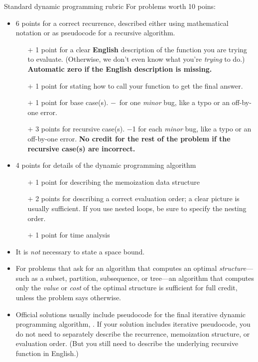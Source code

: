 \documentclass[11pt]{article}
\begin{document}
\begin{rubric}{Standard dynamic programming rubric} For problems worth 10 poins:

\begin{itemize}
\item 6 points for a correct recurrence, described either using mathematical notation or as pseudocode for a recursive algorithm.
\begin{itemize}\cramped
\item[$+$]
1 point for a clear \textbf{English} description of the function you are trying to evaluate.  (Otherwise, we don’t even know what you’re \emph{trying} to do.)  \textbf{Automatic zero if the English description is missing.}
\item[$+$]
1 point for stating how to call your function to get the final answer.
\item[$+$]
1 point for base case(s).  $-$\textonehalf\ for one \emph{minor} bug, like a typo  or an off-by-one error.
\item[$+$]
3 points for recursive case(s).  $-$1 for each \emph{minor} bug, like a typo or an off-by-one error.
\textbf{No credit for the rest of the problem if the recursive case(s) are incorrect.}
\end{itemize}
\item
4 points for details of the dynamic programming algorithm
\begin{itemize}\cramped
\item[$+$]
1 point for describing the memoization data structure
\item[$+$]
2 points for describing a correct evaluation order; a clear picture is usually sufficient.  If you use nested loops, be sure to specify the nesting order.
\item[$+$]
1 point for time analysis
\end{itemize}
\item
It is \emph{not} necessary to state a space bound.

\item
For problems that ask for an algorithm that computes an optimal \emph{structure}---such as a subset, partition, subsequence, or tree---an algorithm that computes only the \emph{value} or \emph{cost} of the optimal structure is sufficient for full credit, unless the problem says otherwise.

\item
Official solutions usually include pseudocode for the final iterative dynamic programming algorithm, .  If your solution includes iterative pseudocode, you do not need to separately describe the recurrence, memoization structure, or  evaluation order.  (But you still need to describe the underlying recursive function in English.)


\end{itemize}
\end{rubric}
\end{document}
